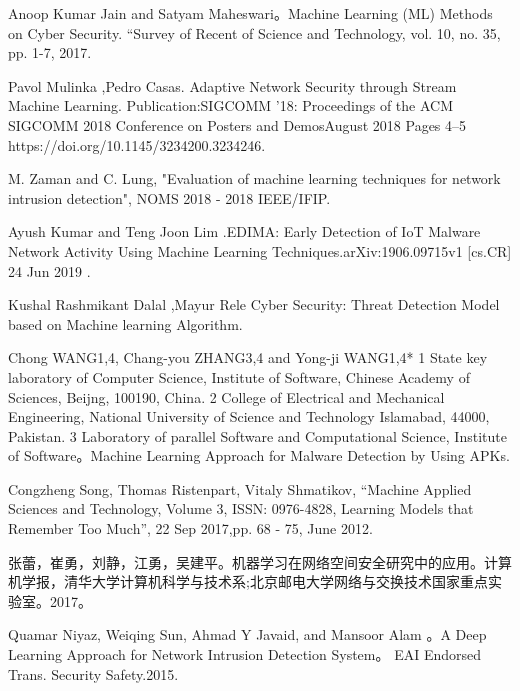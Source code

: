 \documentclass[UTF8]{article}
\begin{document}
\begin{thebibliography}{99}

Anoop Kumar Jain and Satyam Maheswari。Machine Learning (ML) Methods on Cyber Security. “Survey of Recent of Science and Technology​, vol. 10, no. 35, pp. 1-7, 2017.

 Pavol Mulinka ,Pedro Casas. Adaptive Network Security through Stream Machine Learning. Publication:SIGCOMM '18: Proceedings of the ACM SIGCOMM 2018 Conference on Posters and DemosAugust 2018 Pages 4–5 https://doi.org/10.1145/3234200.3234246.

M. Zaman and C. Lung, "Evaluation of machine learning techniques for network intrusion detection", NOMS 2018 - 2018 IEEE/IFIP.

Ayush Kumar and Teng Joon Lim .EDIMA: Early Detection of IoT Malware Network Activity Using Machine Learning Techniques.arXiv:1906.09715v1 [cs.CR] 24 Jun 2019 .

Kushal Rashmikant Dalal ,Mayur Rele Cyber Security: Threat Detection Model based on Machine learning Algorithm.


Chong WANG1,4, Chang-you ZHANG3,4 and Yong-ji WANG1,4* 1 State key laboratory of Computer Science, Institute of Software, Chinese Academy of Sciences, Beijng, 100190, China. 2 College of Electrical and Mechanical Engineering, National University of Science and Technology Islamabad, 44000, Pakistan. 3 Laboratory of parallel Software and Computational Science, Institute of Software。Machine Learning Approach for Malware Detection by Using APKs.

Congzheng Song, Thomas Ristenpart, Vitaly Shmatikov, “Machine Applied Sciences and Technology, ​Volume 3, ISSN: 0976-4828, Learning Models that Remember Too Much”, 22 Sep 2017,pp. 68 - 75, June 2012.

张蕾，崔勇，刘静，江勇，吴建平。机器学习在网络空间安全研究中的应用。计算机学报，清华大学计算机科学与技术系;北京邮电大学网络与交换技术国家重点实验室。2017。


Quamar Niyaz, Weiqing Sun, Ahmad Y Javaid, and Mansoor Alam 。A Deep Learning Approach for Network Intrusion Detection System。 EAI Endorsed Trans. Security Safety.2015.


\end{thebibliography}
\end{document}

